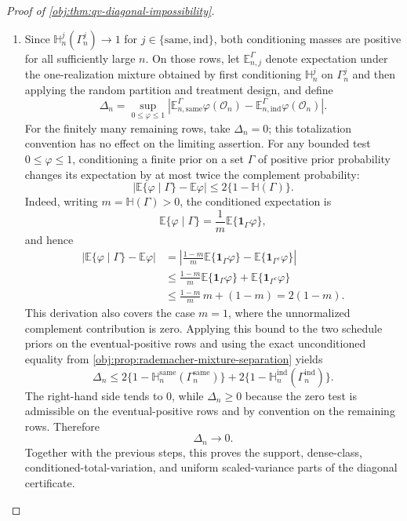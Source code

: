 \documentclass[11pt]{article}
\begin{document}
\begin{proof}[Proof of \cref{obj:thm:qv-diagonal-impossibility}]
\begin{enumerate}
\item Since \(\mathbb H_n^j(\Gamma_n^j)\to1\) for \(j\in\{\mathrm{same},\mathrm{ind}\}\), both conditioning masses are positive for all sufficiently large \(n\). On those rows, let \(\mathbb E_{n,j}^{\Gamma}\) denote expectation under the one-realization mixture obtained by first conditioning \(\mathbb H_n^j\) on \(\Gamma_n^j\) and then applying the random partition and treatment design, and define
\[
\Delta_n=
\sup_{0\le \varphi\le1}
\left|
\mathbb E_{n,\mathrm{same}}^{\Gamma}\varphi(\mathcal O_n)
-
\mathbb E_{n,\mathrm{ind}}^{\Gamma}\varphi(\mathcal O_n)
\right|.
\]
For the finitely many remaining rows, take \(\Delta_n=0\); this totalization convention has no effect on the limiting assertion. For any bounded test \(0\le\varphi\le1\), conditioning a finite prior on a set \(\Gamma\) of positive prior probability changes its expectation by at most twice the complement probability:
\[
\left|
\mathbb E\{\varphi\mid \Gamma\}-\mathbb E\varphi
\right|
\le
2\{1-\mathbb H(\Gamma)\}.
\]
Indeed, writing \(m=\mathbb H(\Gamma)>0\), the conditioned expectation is
\[
\mathbb E\{\varphi\mid\Gamma\}=\frac{1}{m}\mathbb E\{\mathbf 1_\Gamma\varphi\},
\]
and hence
\[
\begin{aligned}
\left|
\mathbb E\{\varphi\mid \Gamma\}-\mathbb E\varphi
\right|
&=
\left|
\frac{1-m}{m}\mathbb E\{\mathbf 1_\Gamma\varphi\}
-
\mathbb E\{\mathbf 1_{\Gamma^c}\varphi\}
\right| \\
&\le
\frac{1-m}{m}\mathbb E\{\mathbf 1_\Gamma\varphi\}
+
\mathbb E\{\mathbf 1_{\Gamma^c}\varphi\} \\
&\le
\frac{1-m}{m}\,m+(1-m)
=2(1-m).
\end{aligned}
\]
This derivation also covers the case \(m=1\), where the unnormalized complement contribution is zero. Applying this bound to the two schedule priors on the eventual-positive rows and using the exact unconditioned equality from \cref{obj:prop:rademacher-mixture-separation} yields
\[
\Delta_n
\le
2\{1-\mathbb H_n^{\mathrm{same}}(\Gamma_n^{\mathrm{same}})\}
+
2\{1-\mathbb H_n^{\mathrm{ind}}(\Gamma_n^{\mathrm{ind}})\}.
\]
The right-hand side tends to \(0\), while \(\Delta_n\ge0\) because the zero test is admissible on the eventual-positive rows and by convention on the remaining rows. Therefore
\[
\Delta_n\to0.
\]
Together with the previous steps, this proves the support, dense-class, conditioned-total-variation, and uniform scaled-variance parts of the diagonal certificate. %


\end{enumerate}
\end{proof}
\end{document}
